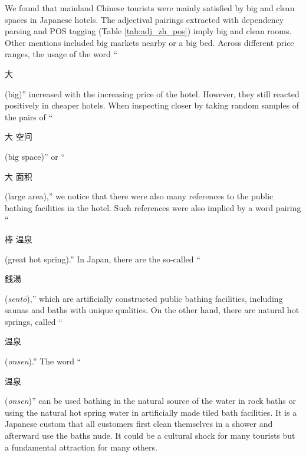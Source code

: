 \documentclass[smallextended,natbib]{svjour3}       %
\begin{document}
    We found that mainland Chinese tourists were mainly satisfied by big and clean spaces in Japanese hotels. The adjectival pairings extracted with dependency parsing and POS tagging (Table \ref{tab:adj_zh_pos})  imply big and clean rooms. Other mentions included big markets nearby or a big bed. Across different price ranges, the usage of the word ``\begin{CJK}{UTF8}{gbsn}大\end{CJK} (big)'' increased with the increasing price of the hotel. However, they still reacted positively in cheaper hotels. When inspecting closer by taking random samples of the pairs of ``\begin{CJK}{UTF8}{gbsn}大 空间\end{CJK} (big space)'' or ``\begin{CJK}{UTF8}{gbsn}大 面积\end{CJK} (large area),'' we notice that there were also many references to the public bathing facilities in the hotel. Such references were also implied by a word pairing ``\begin{CJK}{UTF8}{gbsn}棒 温泉\end{CJK} (great hot spring).'' In Japan, there are the so-called ``\begin{CJK}{UTF8}{min}銭湯\end{CJK} (\textit{sent\=o}),'' which are artificially constructed public bathing facilities, including saunas and baths with unique qualities. On the other hand, there are natural hot springs, called ``\begin{CJK}{UTF8}{gbsn}温泉\end{CJK} (\textit{onsen}).'' The word ``\begin{CJK}{UTF8}{gbsn}温泉\end{CJK} (\textit{onsen})'' can be used bathing in the natural source of the water in rock baths or using the natural hot spring water in artificially made tiled bath facilities. It is a Japanese custom that all customers first clean themselves in a shower and afterward use the baths nude. It could be a cultural shock for many tourists but a fundamental attraction for many others. 
\end{document}
